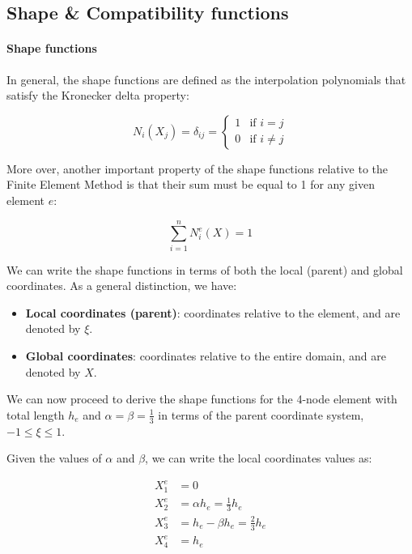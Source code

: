 \subsection{Shape \& Compatibility functions}
\label{subsec:shape_functions}

\paragraph{Shape functions}

In general, the shape functions are defined as the interpolation polynomials that satisfy the Kronecker delta property:

\begin{equation}
    N_i(X_j) = \delta_{ij} = \begin{cases}
        1 & \text{if } i = j    \\
        0 & \text{if } i \neq j
    \end{cases}
\end{equation}

More over, another important property of the shape functions relative to the Finite Element Method is that their sum must be equal to 1 for any given element $e$:

\begin{equation}
    \sum_{i=1}^{n} N_i^e(X) = 1
\end{equation}

We can write the shape functions in terms of both the local (parent) and global coordinates.
As a general distinction, we have:

\begin{itemize}
    \item \textbf{Local coordinates (parent)}: coordinates relative to the element, and are denoted by $\xi$.
    \item \textbf{Global coordinates}: coordinates relative to the entire domain, and are denoted by $X$.
\end{itemize}

We can now proceed to derive the shape functions for the 4-node element with total length $h_e$ and $\alpha = \beta = \frac{1}{3}$ in terms of the parent coordinate system, $-1 \leq \xi \leq 1$.

Given the values of $\alpha$ and $\beta$, we can write the local coordinates values as:

\begin{align}
    X_1^e & = 0                                 \\
    X_2^e & = \alpha h_e = \frac{1}{3} h_e      \\
    X_3^e & = h_e - \beta h_e = \frac{2}{3} h_e \\
    X_4^e & = h_e
\end{align}

